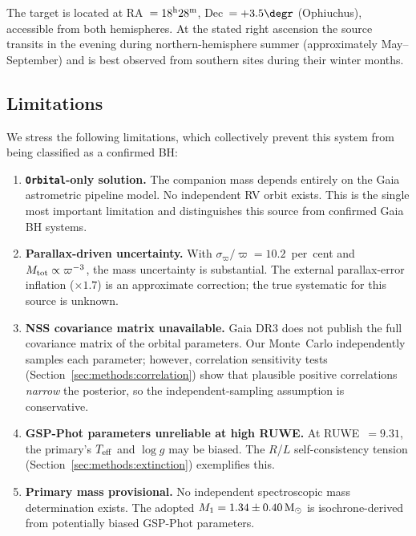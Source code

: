 \documentclass[usenatbib,fleqn]{mnras}
\newcommand{\Msun}{{\rm M}_\odot}
\begin{document}
The target is located at RA~$= 18^{\rm h}28^{\rm m}$,
Dec~$= +3.5\degr$ (Ophiuchus), accessible from both hemispheres.
At the stated right ascension the source transits in the evening
during northern-hemisphere summer (approximately May--September)
and is best observed from southern sites during their winter months.

\subsection{Limitations}
\label{sec:limitations}

We stress the following limitations, which collectively
prevent this system from being classified as a confirmed BH:

\begin{enumerate}
\item \textbf{\texttt{Orbital}-only solution.}  The companion mass
  depends entirely on the Gaia astrometric pipeline model.
  No independent RV orbit exists.  This is the single most
  important limitation and distinguishes this source from
  confirmed Gaia BH systems.

\item \textbf{Parallax-driven uncertainty.}  With
  $\sigma_\varpi / \varpi = 10.2$~per~cent and
  $M_{\rm tot} \propto \varpi^{-3}$, the mass uncertainty is
  substantial.  The external parallax-error inflation ($\times 1.7$)
  is an approximate correction; the true systematic for this
  source is unknown.

\item \textbf{NSS covariance matrix unavailable.}  Gaia DR3 does
  not publish the full covariance matrix of the orbital parameters.
  Our Monte~Carlo independently samples each parameter; however,
  correlation sensitivity tests
  (Section~\ref{sec:methods:correlation}) show that plausible
  positive correlations \emph{narrow} the posterior, so the
  independent-sampling assumption is conservative.

\item \textbf{GSP-Phot parameters unreliable at high RUWE.}
  At RUWE~$= 9.31$, the primary's $T_{\rm eff}$ and $\log g$
  may be biased.  The $R$/$L$ self-consistency tension
  (Section~\ref{sec:methods:extinction}) exemplifies this.

\item \textbf{Primary mass provisional.}  No independent
  spectroscopic mass determination exists.  The adopted
  $M_1 = 1.34 \pm 0.40\,\Msun$ is isochrone-derived from
  potentially biased GSP-Phot parameters.


\end{enumerate}
\end{document}
